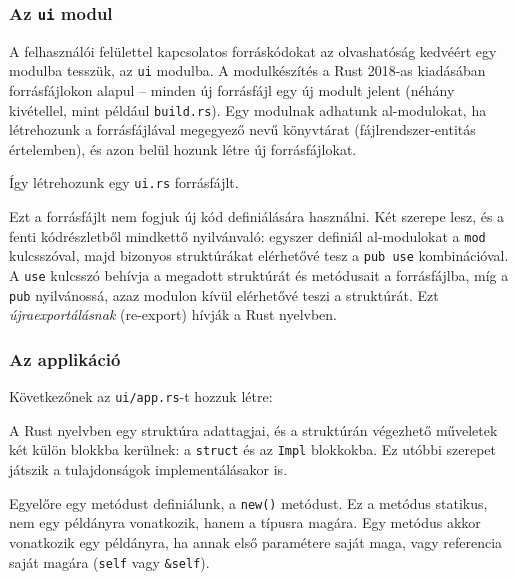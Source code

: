 
\subsubsection{Az \texttt{ui} modul}

A felhasználói felülettel kapcsolatos forráskódokat az olvashatóság kedvéért egy modulba tesszük,
az \texttt{ui} modulba.
A modulkészítés a Rust 2018-as kiadásában forrásfájlokon alapul -- 
minden új forrásfájl egy új modult jelent (néhány kivétellel, mint például \texttt{build.rs}).
Egy modulnak adhatunk al-modulokat, ha létrehozunk a forrásfájlával megegyező nevű könyvtárat (fájlrendszer-entitás értelemben),
és azon belül hozunk létre új forrásfájlokat.

Így létrehozunk egy \texttt{ui.rs} forrásfájlt.



Ezt a forrásfájlt nem fogjuk új kód definiálására használni.
Két szerepe lesz, és a fenti kódrészletből mindkettő nyilvánvaló: 
egyszer definiál al-modulokat a \texttt{mod} kulcsszóval,
majd bizonyos struktúrákat elérhetővé tesz a \texttt{pub use} kombinációval.
A \texttt{use} kulcsszó behívja a megadott struktúrát és metódusait a forrásfájlba,
míg a \texttt{pub} nyilvánossá, azaz modulon kívül elérhetővé teszi a struktúrát.
Ezt \textit{újraexportálásnak} (re-export) hívják a Rust nyelvben.

\subsubsection{Az applikáció}

Következőnek az \texttt{ui/app.rs}-t hozzuk létre:



A Rust nyelvben egy struktúra adattagjai, és a struktúrán végezhető műveletek két külön blokkba
kerülnek: a \texttt{struct} és az \texttt{Impl} blokkokba.
Ez utóbbi szerepet játszik a tulajdonságok implementálásakor is.

Egyelőre egy metódust definiálunk, a \texttt{new()} metódust.
Ez a metódus statikus, nem egy példányra vonatkozik, hanem a típusra magára.
Egy metódus akkor vonatkozik egy példányra, ha annak első paramétere saját maga, vagy referencia saját magára
(\texttt{self} vagy \verb+&self+).


